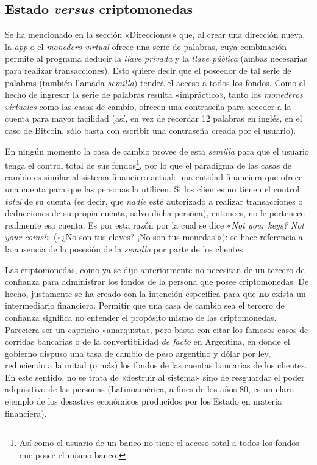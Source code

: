 \documentclass[12pt,a4paper,twoside]{book}
\begin{document}
\subsection{Estado \textit{versus} criptomonedas}
Se ha mencionado en la sección «Direcciones» que, al crear una dirección nueva, la \textit{app} o el \textit{monedero virtual} ofrece una serie de palabras, cuya combinación permite al programa deducir la \textit{llave privada} y la \textit{llave pública} (ambas necesarias para realizar transacciones). Esto quiere decir que el poseedor de tal serie de palabras (también llamada  \textit{semilla}) tendrá el acceso a todos los fondos. Como el hecho de ingresar la serie de palabras resulta «impráctico», tanto los \textit{monederos virtuales} como las casas de cambio, ofrecen una contraseña para acceder a la cuenta para mayor facilidad (así, en vez de recordar 12 palabras en inglés, en el caso de Bitcoin, sólo basta con escribir una contraseña creada por el usuario).

En ningún momento la casa de cambio provee de esta \textit{semilla} para que el usuario tenga el control total de sus fondos\footnote{Así como el usuario de un banco no tiene el acceso total a todos los fondos que posee el mismo banco.}, por lo que el paradigma de las casas de cambio es similar al sistema financiero actual: una entidad financiera que ofrece una cuenta para que las personas la utilicen. Si los clientes no tienen el control \textit{total} de su cuenta (es decir, que \textit{nadie} esté autorizado a realizar transacciones o deducciones de su propia cuenta, salvo dicha persona), entonces, no le pertenece realmente esa cuenta. Es por esta razón por la cual se dice «\textit{Not your keys? Not your coins!}» («¿No son tus claves? ¡No son tus monedas!»): se hace referencia a la ausencia de la posesión de la \textit{semilla} por parte de los clientes.

Las criptomonedas, como ya se dijo anteriormente no necesitan de un tercero de confianza para administrar los fondos de la persona que posee criptomonedas. De hecho, justamente se ha creado con la intención específica para que \textbf{no} exista un intermediario financiero. Permitir que una casa de cambio sea el tercero de confianza significa no entender el propósito mismo de las criptomonedas. Pareciera ser un capricho «anarquista», pero basta con citar los famosos casos de corridas bancarias o de la convertibilidad \textit{de facto} en Argentina, en donde el gobierno dispuso una tasa de cambio de peso argentino y dólar por ley, reduciendo a la mitad (o más) los fondos de las cuentas bancarias de los clientes. En este sentido, no se trata de «destruir al sistema» sino de resguardar el poder adquisitivo de las personas (Latinoamérica, a fines de los años 80, es un claro ejemplo de los desastres económicos producidos por los Estado en materia financiera).
\end{document}
